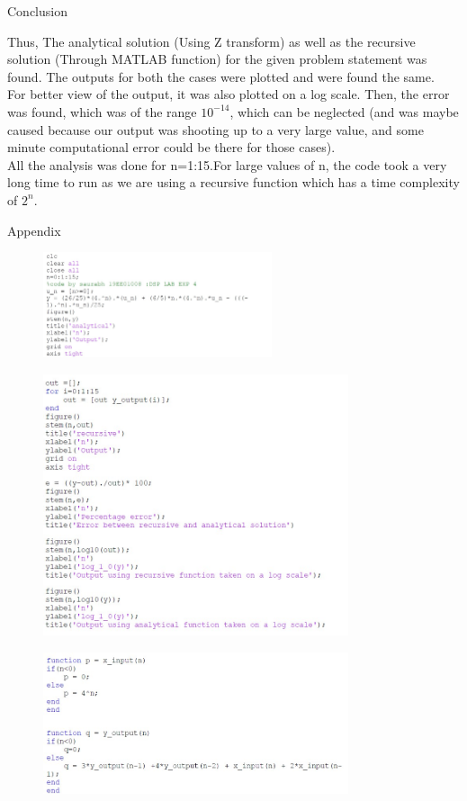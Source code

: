 \documentclass[12pt, letterpaper]{article}
\begin{document}
\begin{section}{Conclusion}
\end{section}
Thus, The analytical solution (Using Z transform) as well as the recursive solution (Through MATLAB function) for the given problem statement was found. The outputs for both the cases were plotted and were found the same. \\For better view of the output, it was also plotted on a log scale. Then, the error was found, which was of the range $10^{-14}$, which can be neglected (and was maybe caused because our output was shooting up to a very large value, and some minute computational error could be there for those cases).\\All the analysis was done for n=1:15.For large values of n, the code took a very long time to run as we are using a recursive function which has a time complexity of $2^n$.


\begin{section}{Appendix}
\begin{figure}[!htp]
\includegraphics[width=0.6\textwidth]{fig11.jpg}
\end{figure}
\begin{figure}[!htp]
\includegraphics[width=0.8\textwidth]{fig12.jpg}
\end{figure}

\begin{figure}[!htp]
\includegraphics[width=0.8\textwidth]{fig13.jpg}
\end{figure}

\end{section}
\end{document}
